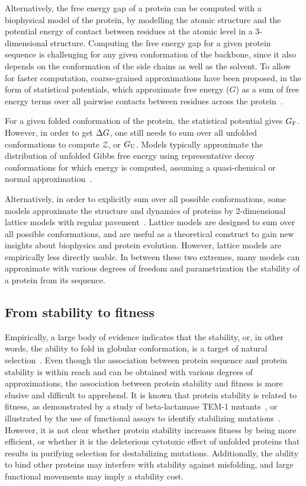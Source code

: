 Alternatively, the free energy gap of a protein can be computed with a biophysical model of the protein, by modelling the atomic structure and the potential energy of contact between residues at the atomic level in a 3-dimensional structure.
Computing the free energy gap for a given protein sequence is challenging for any given conformation of the backbone, since it also depends on the conformation of the side chains as well as the solvent.
To allow for faster computation, coarse-grained approximations have been proposed, in the form of statistical potentials, which approximate free energy ($G$) as a sum of free energy terms over all pairwise contacts between residues across the protein~\citep{Miyazawa1985}.

For a given folded conformation of the protein, the statistical potential gives $G_{\text{F}}$.
However, in order to get $\Delta G$, one still needs to sum over all unfolded conformations to compute $\mathcal{Z}$, or $G_{\text{U}}$.
Models typically approximate the distribution of unfolded Gibbs free energy using representative decoy conformations for which energy is computed, assuming a quasi-chemical or normal approximation~\citep{Goldstein2011}.

Alternatively, in order to explicitly sum over all possible conformations, some models approximate the structure and dynamics of proteins by 2-dimensional lattice models with regular pavement~\citep{Taverna2002, Noivirt-Brik2009}.
Lattice models are designed to sum over all possible conformations, and are useful as a theoretical construct to gain new insights about biophysics and protein evolution.
However, lattice models are empirically less directly usable.
In between these two extremes, many models can approximate with various degrees of freedom and parametrization the stability of a protein from its sequence.

\subsection{From stability to fitness}

Empirically, a large body of evidence indicates that the stability, or, in other words, the ability to fold in globular conformation, is a target of natural selection~\citep{Sikosek2014}.
Even though the association between protein sequence and protein stability is within reach and can be obtained with various degrees of approximations, the association between protein stability and fitness is more elusive and difficult to apprehend.
It is known that protein stability is related to fitness, as demonstrated by a study of beta-lactamase TEM-1 mutants~\citep{Jacquier2013}, or illustrated by the use of functional assays to identify stabilizing mutations~\citep{Araya2012}.
However, it is not clear whether protein stability increases fitness by being more efficient, or whether it is the deleterious cytotoxic effect of unfolded proteins that results in purifying selection for destabilizing mutations.
Additionally, the ability to bind other proteins may interfere with stability against misfolding, and large functional movements may imply a stability cost.

